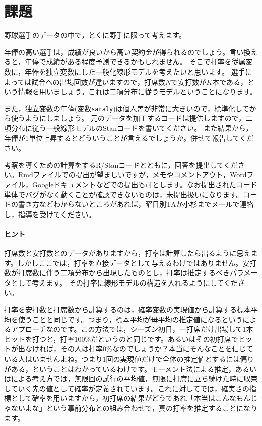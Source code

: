 \documentclass{ltjsbook}
\begin{document}
\section{課題}
野球選手のデータの中で，とくに野手に限って考えます。

年俸の高い選手は，成績が良いから高い契約金が得られるのでしょう。言い換えると，年俸で成績がある程度予測できるかもしれません。
そこで打率を従属変数に，年俸を独立変数にした一般化線形モデルを考えたいと思います。
選手によっては試合への出場回数が違いますので，打席数$N$で安打数が$K$本である，という情報を用いましょう。これは二項分布に従うモデルということになります。

また，独立変数の年俸(変数\verb|saraly|)は個人差が非常に大きいので，標準化してから使うようにしましょう。
元のデータを加工するコードは提供しますので，二項分布に従う一般線形モデルのStanコードを書いてください。
また結果から，年俸が1単位上昇するとどういうことが言えるでしょうか。併せて報告してください。

考察を導くための計算をするR/Stanコードとともに，回答を提出してください。Rmdファイルでの提出が望ましいですが，メモやコメントアウト，Wordファイル，Googleドキュメントなどでの提出も可とします。なお提出されたコード単体でバグがなく動くことが確認できないものは，未提出扱いになります。コードの書き方などわからないところがあれば，曜日別TAか小杉までメールで連絡し，指導を受けてください。

\paragraph{ヒント}
打席数と安打数とのデータがありますから，打率は計算したら出るように思えます。しかしここでは，打率を直接データとして与えるわけではありません。安打数が打席数に伴う二項分布から出現したものとし，打率は推定するべきパラメータとして考えます。
その打率に線形モデルの構造を入れるようにしてください。

打率を安打数と打席数から計算するのは，確率変数の実現値から計算する標本平均を使うことと同じです。つまり，標本平均が母平均の推定値になるというによるアプローチなのです。この方法では，シーズン初日，一打席だけ出場して1本ヒットを打つと，打率100\%だというのと同じです。あるいはその初打席でヒットが出なければ，その人は打率0\%なのでしょうか？本当にそんなことを信じている人はいませんよね。つまり1回の実現値だけで全体の推定値とするには偏りがある，ということはわかっているわけです。モーメント法による推定，あるいはによる考え方では，無限回の試行の平均値，無限に打席に立ち続けた時に収束していく先の値として確率が定義されています。これに対してでは，確実さの指標として確率を用いますから，初打席の結果がどうであれ「本当はこんなもんじゃないよな」という事前分布との組み合わせで，真の打率を推定することになります。
\end{document}
